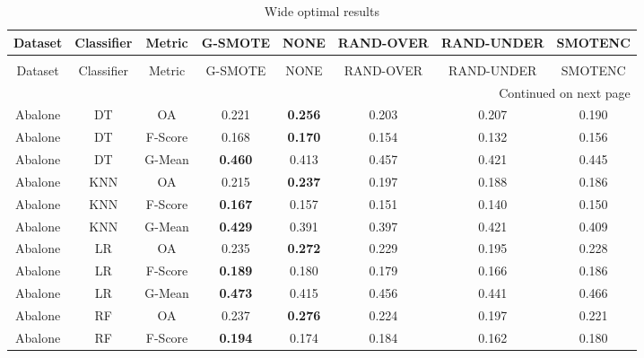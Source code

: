 \begin{longtable}{cccccccc}
\caption{Wide optimal results}
\label{tbl:wide_optimal}\\
\toprule
        Dataset & Classifier &  Metric &        G-SMOTE &           NONE &      RAND-OVER &     RAND-UNDER &        SMOTENC \\
\midrule
\endfirsthead
\caption[]{Wide optimal results} \\
\toprule
        Dataset & Classifier &  Metric &        G-SMOTE &           NONE &      RAND-OVER &     RAND-UNDER &        SMOTENC \\
\midrule
\endhead
\midrule
\multicolumn{8}{r}{{Continued on next page}} \\
\midrule
\endfoot

\bottomrule
\endlastfoot
        Abalone &         DT &      OA &          0.221 & \textbf{0.256} &          0.203 &          0.207 &          0.190 \\
        Abalone &         DT & F-Score &          0.168 & \textbf{0.170} &          0.154 &          0.132 &          0.156 \\
        Abalone &         DT &  G-Mean & \textbf{0.460} &          0.413 &          0.457 &          0.421 &          0.445 \\
        Abalone &        KNN &      OA &          0.215 & \textbf{0.237} &          0.197 &          0.188 &          0.186 \\
        Abalone &        KNN & F-Score & \textbf{0.167} &          0.157 &          0.151 &          0.140 &          0.150 \\
        Abalone &        KNN &  G-Mean & \textbf{0.429} &          0.391 &          0.397 &          0.421 &          0.409 \\
        Abalone &         LR &      OA &          0.235 & \textbf{0.272} &          0.229 &          0.195 &          0.228 \\
        Abalone &         LR & F-Score & \textbf{0.189} &          0.180 &          0.179 &          0.166 &          0.186 \\
        Abalone &         LR &  G-Mean & \textbf{0.473} &          0.415 &          0.456 &          0.441 &          0.466 \\
        Abalone &         RF &      OA &          0.237 & \textbf{0.276} &          0.224 &          0.197 &          0.221 \\
        Abalone &         RF & F-Score & \textbf{0.194} &          0.174 &          0.184 &          0.162 &          0.180 \\

\end{longtable}
